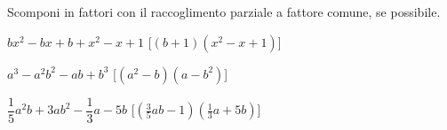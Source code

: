 \begin{esercizio}[\Ast]
\label{ese:div.015}
Scomponi in fattori con il raccoglimento parziale a fattore comune, se possibile.
\begin{enumeratea}
 \item \(bx^{2}-bx+b+x^{2}-x+1\) 
  \hfill [\((b+1)(x^{2}-x+1)\)]
 \item \(a^{3}-a^{2}b^{2}-ab+b^{3}\) 
  \hfill [\(\left(a^{2}-b\right)\left(a-b^{2}\right)\)]
 \item \(\dfrac{1}{5}a^{2}b+3ab^{2}-\dfrac{1}{3}a-5b\) 
  \hfill [\(\left(\frac{3}{5}ab-1\right)\left(\frac{1}{3}a+5b\right)\)]
\end{enumeratea}
\end{esercizio}
% 
% 
% 
